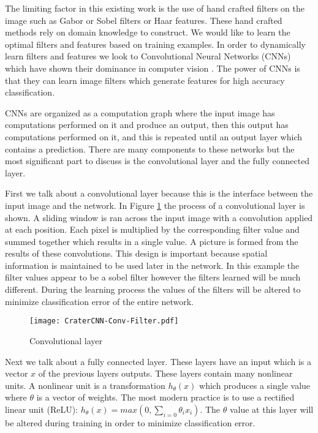 \documentclass[twoside]{article}
\begin{document}

The limiting factor in this existing work is the use of hand crafted filters on the image such as Gabor or Sobel filters or Haar features. These hand crafted methods rely on domain knowledge to construct. We would like to learn the optimal filters and features based on training examples. In order to dynamically learn filters and features we look to Convolutional Neural Networks (CNNs) which have shown their dominance in computer vision \cite{krizhevsky_imagenet_2012}. The power of CNNs is that they can learn image filters which generate features for high accuracy classification.

CNNs are organized as a computation graph where the input image has computations performed on it and produce an output, then this output has computations performed on it, and this is repeated until an output layer which contains a prediction. There are many components to these networks but the most significant part to discuss is the convolutional layer and the fully connected layer.


First we talk about a convolutional layer because this is the interface between the input image and the network. In Figure \ref{fig:convlayer} the process of a convolutional layer is shown. A sliding window is ran across the input image with a convolution applied at each position. Each pixel is multiplied by the corresponding filter value and summed together which results in a single value. A picture is formed from the results of these convolutions. This design is important because  spatial information is maintained to be used later in the network. In this example the filter values appear to be a sobel filter however the filters learned will be much different. During the learning process the values of the filters will be altered to minimize classification error of the entire network.

\begin{figure}[h]
\begin{center}
\vspace{-10pt}
  \texttt{[image: CraterCNN-Conv-Filter.pdf]}
  \caption[labelInTOC]{Convolutional layer}
  \label{fig:convlayer}
\end{center}
\vspace{-20pt}
\end{figure}

Next we talk about a fully connected layer. These layers have an input which is a vector $x$ of the previous layers outputs. These layers contain many nonlinear units. A nonlinear unit is a transformation $h_\theta(x)$ which produces a single value where $\theta$ is a vector of weights. The most modern practice is to use a rectified linear unit (ReLU): $h_\theta(x)=max(0,\sum_{i=0}\theta_i x_i)$. The $\theta$ value at this layer will be altered during training in order to minimize classification error.
\end{document}
